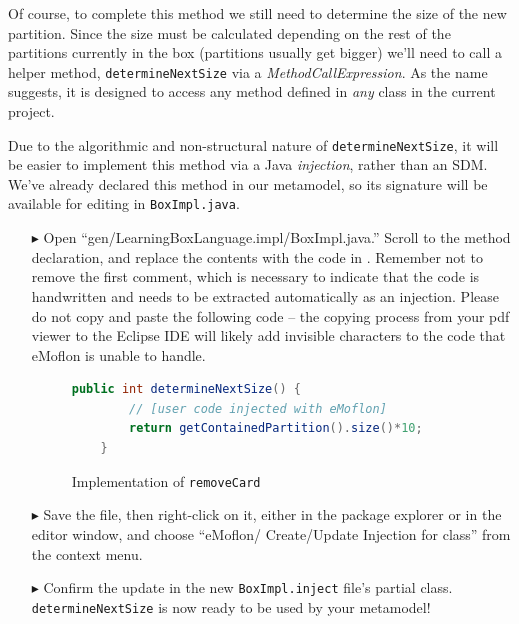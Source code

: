 Of course, to complete this method we still need to determine the size of the new partition. Since the size must be calculated depending on the
rest of the partitions currently in the box (partitions usually get bigger) we'll need to call a helper method, \texttt{determineNextSize} via a
\emph{MethodCallExpression}. As the name suggests, it is designed to access any method defined in \emph{any} class in the current
project.

Due to the algorithmic and non-structural nature of \texttt{determineNextSize}, it will be easier to implement this method via a Java \emph{injection}, rather
than an SDM. We've already declared this method in our metamodel, so its signature will be available for editing in \texttt{BoxImpl.java}.

\begin{itemize}

\item[$\blacktriangleright$] Open ``gen/LearningBoxLanguage.impl/BoxImpl.java.'' Scroll to the method declaration, and replace the contents with the code in
. Remember not to remove the first comment, which is necessary to indicate that the code is handwritten and needs to be
extracted automatically as an injection. Please do not copy and paste the following code -- the copying process from your pdf viewer to the Eclipse IDE
will likely add invisible characters to the code that eMoflon is unable to handle.

\begin{figure}[htbp]
        \centering
        \begin{lstlisting}[language=Java, keywordstyle={\bfseries\color{purple}}, backgroundcolor=\color{white}]
    public int determineNextSize() {
    	// [user code injected with eMoflon]
        return getContainedPartition().size()*10;
    }
        \end{lstlisting}
        \caption{Implementation of \texttt{removeCard}}
        \label{code:determineNextSize_impl}
\end{figure}


\item[$\blacktriangleright$] Save the file, then right-click on it, either in the package explorer or in the editor window, and choose ``eMoflon/
Create/Update Injection for class'' from the context menu. 

\item[$\blacktriangleright$] Confirm the update in the new \texttt{BoxImpl.inject} file's partial class. \texttt{determineNextSize} is now ready to be used by
your metamodel!

\end{itemize}


